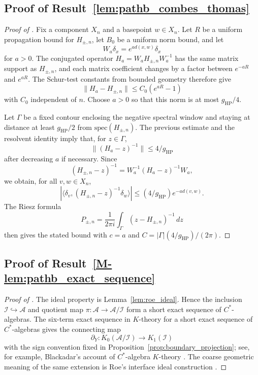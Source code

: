 \documentclass[11pt]{article}
\numberwithin{equation}{section}
\theoremstyle{definition}
\theoremstyle{remark}
\newcommand{\spec}{\mathrm{spec}}
\begin{document}
\subsection{Proof of Result~\ref{lem:pathb_combes_thomas}}\label{app:proof:lem:pathb_combes_thomas}
\begin{proof}[Proof of ]
Fix a component \(X_n\) and a basepoint \(w\in X_n\). Let \(R\) be a uniform propagation bound for
\(H_{\pm,n}\), let \(B_0\) be a uniform norm bound, and let
\[
W_a\delta_x=e^{a d(x,w)}\delta_x
\]
for \(a>0\). The conjugated operator \(H_a=W_aH_{\pm,n}W_a^{-1}\) has the same matrix support as
\(H_{\pm,n}\), and each matrix coefficient changes by a factor between \(e^{-aR}\) and \(e^{aR}\).
The Schur-test constants from bounded geometry therefore give
\[
\|H_a-H_{\pm,n}\|\le C_0(e^{aR}-1)
\]
with \(C_0\) independent of \(n\). Choose \(a>0\) so that this norm is at most \(g_{\mathrm{HP}}/4\).

Let \(\Gamma\) be a fixed contour enclosing the negative spectral window and staying at distance
at least \(g_{\mathrm{HP}}/2\) from \(\spec(H_{\pm,n})\). The previous estimate and the resolvent
identity imply that, for \(z\in\Gamma\),
\[
\|(H_a-z)^{-1}\|\le 4/g_{\mathrm{HP}}
\]
after decreasing \(a\) if necessary. Since
\[
(H_{\pm,n}-z)^{-1}
=W_a^{-1}(H_a-z)^{-1}W_a,
\]
we obtain, for all \(v,w\in X_n\),
\[
\left|\langle\delta_v,(H_{\pm,n}-z)^{-1}\delta_w\rangle\right|
\le (4/g_{\mathrm{HP}})e^{-a d(v,w)}.
\]
The Riesz formula
\[
P_{\pm,n}=\frac{1}{2\pi i}\int_\Gamma (z-H_{\pm,n})^{-1}\,dz
\]
then gives the stated bound with \(c=a\) and \(C=|\Gamma|(4/g_{\mathrm{HP}})/(2\pi)\).
\end{proof}

\subsection{Proof of Result~\ref{M-lem:pathb_exact_sequence}}\label{app:proof:lem:pathb_exact_sequence}
\begin{proof}[Proof of ]
The ideal property is Lemma~\ref{lem:roe_ideal}. Hence the inclusion
\(\mathcal I\hookrightarrow \mathcal A\) and quotient map \(\pi:\mathcal A\to\mathcal A/\mathcal I\)
form a short exact sequence of \(C^*\)-algebras. The six-term exact sequence in \(K\)-theory for a
short exact sequence of \(C^*\)-algebras gives the connecting map
\[
\partial_Y:K_0(\mathcal A/\mathcal I)\to K_1(\mathcal I)
\]
with the sign convention fixed in Proposition~\ref{prop:boundary_projection}; see, for example,
Blackadar's account of \(C^*\)-algebra \(K\)-theory \cite{BlackadarKTheory}. The coarse geometric
meaning of the same extension is Roe's interface ideal construction \cite{RoeLectures}.
\end{proof}
\end{document}
